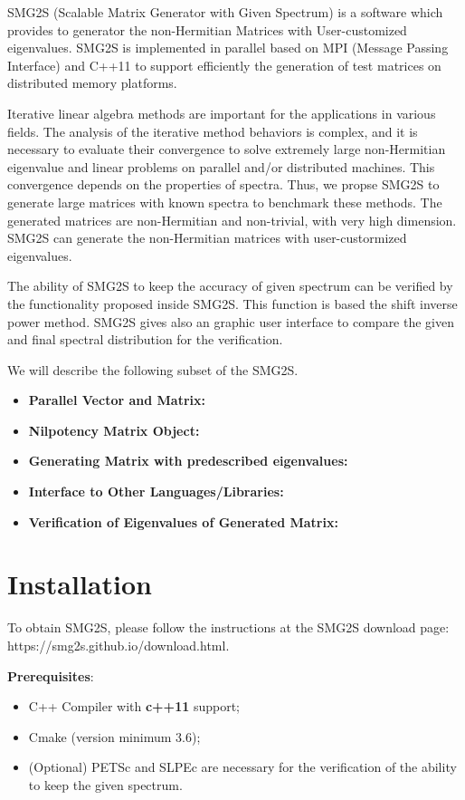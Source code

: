 \documentclass[a4paper, 10 pt]{report}
\begin{document}
	SMG2S (Scalable Matrix Generator with Given Spectrum) is a software which provides to generator the non-Hermitian Matrices with User-customized eigenvalues. SMG2S is implemented in parallel based on MPI (Message Passing Interface) and C++11 to support efficiently the generation of test matrices on distributed memory platforms.

	Iterative linear algebra methods are important for the applications in various fields. The analysis of the iterative method behaviors is complex, and it is necessary to evaluate their convergence to solve extremely large non-Hermitian eigenvalue and linear problems on parallel and/or distributed machines. This convergence depends on the properties of spectra. Thus, we propse SMG2S to generate large matrices with known spectra to benchmark these methods. The generated matrices are non-Hermitian and non-trivial, with very high dimension. SMG2S can generate the non-Hermitian matrices with user-custormized eigenvalues. 
	
	The ability of SMG2S to keep the accuracy of given spectrum can be verified by the functionality proposed inside SMG2S. This function is based the shift inverse power method. SMG2S gives also an graphic user interface to compare the given and final spectral distribution for the verification.

	We will describe the following subset of the SMG2S.
	\begin{itemize}
		\item \textbf{Parallel Vector and Matrix:}
		\item \textbf{Nilpotency Matrix Object:}
		\item \textbf{Generating Matrix with predescribed eigenvalues:}
		\item \textbf{Interface to Other Languages/Libraries:}
		\item \textbf{Verification of Eigenvalues of Generated Matrix:}
	\end{itemize}

	\section{Installation}
	To obtain SMG2S, please follow the instructions at the SMG2S download page: https://smg2s.github.io/download.html.
	
	\textbf{Prerequisites}:
	
	\begin{itemize}
		\item C++ Compiler with \textbf{c++11} support;
		\item Cmake (version minimum 3.6);
		\item (Optional) PETSc and SLPEc are necessary for the verification of the ability to keep the given spectrum.
	\end{itemize}
	
\end{document}

